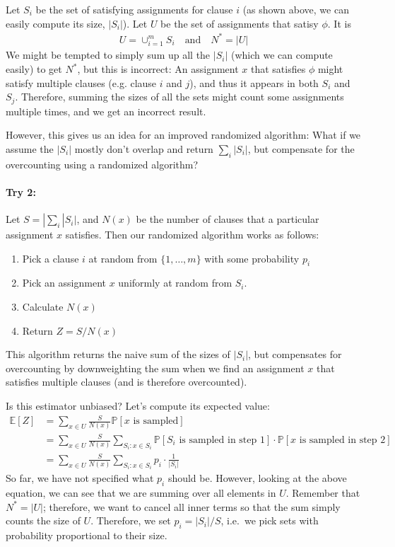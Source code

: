 \documentclass[11pt]{article}
\begin{document}
Let $S_i$ be the set of satisfying assignments for clause $i$ (as shown above, we can easily compute its size, $|S_i|$). Let $U$ be the set of assignments that satisy $\phi$. It is
%
\begin{align*}
	U = \cup_{i=1}^m S_i \quad \text{and} \quad N^* = |U|
\end{align*}
%
We might be tempted to simply sum up all the $|S_i|$ (which we can compute easily) to get $N^*$, but this is incorrect: An assignment $x$ that satisfies $\phi$ might satisfy multiple clauses (e.g. clause $i$ and $j$), and thus it appears in both $S_i$ and $S_j$. Therefore, summing the sizes of all the sets might count some assignments multiple times, and we get an incorrect result.

However, this gives us an idea for an improved randomized algorithm: What if we assume the $|S_i|$ mostly don't overlap and return $\sum_i |S_i|$, but compensate for the overcounting using a randomized algorithm?

\paragraph*{Try 2:}   Let $S=|\sum_i |S_i|$, and $N(x)$ be the number of clauses that a particular assignment $x$ satisfies. Then our randomized algorithm works as follows:
%
\begin{enumerate}
	\item Pick a clause $i$ at random from $\{1, \ldots, m\}$ with some probability $p_i$
	\item Pick an assignment $x$ uniformly at random from $S_i$.
	\item Calculate $N(x)$
	\item Return $Z = S/N(x)$
\end{enumerate}
%
This algorithm returns the naive sum of the sizes of $|S_i|$, but compensates for overcounting by downweighting the sum when we find an assignment $x$ that satisfies multiple clauses (and is therefore overcounted).

Is this estimator unbiased? Let's compute its expected value:
%
\begin{align*}
	\mathbb{E}[Z]
		&= \sum_{x \in U} \frac{S}{N(x)} \mathbb{P}[x\text{ is sampled}] \\
		&= \sum_{x \in U} \frac{S}{N(x)} \sum_{S_i: x \in S_i} \mathbb{P}[S_i\text{ is sampled in step 1}] \cdot \mathbb{P}[x\text{ is sampled in step 2}] \\
		&= \sum_{x \in U} \frac{S}{N(x)} \sum_{S_i: x \in S_i} p_i \cdot \frac{1}{|S_i|}
\end{align*}
%
So far, we have not specified what $p_i$ should be. However, looking at the above equation, we can see that we are summing over all elements in $U$. Remember that $N^*=|U|$; therefore, we want to cancel all inner terms so that the sum simply counts the size of $U$. Therefore, we set $p_i = |S_i|/S$, i.e.\ we pick sets with probability proportional to their size.
\end{document}
